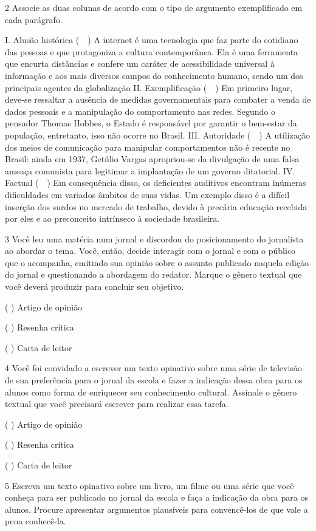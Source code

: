 \num{2} Associe as duas colunas de acordo com o tipo de argumento
exemplificado em cada parágrafo.

I. Alusão histórica (~~) A internet é uma tecnologia que faz
parte do cotidiano das pessoas e que protagoniza a cultura
contemporânea. Ela é uma ferramenta que encurta distâncias e confere um
caráter de acessibilidade universal à informação e aos mais diversos
campos do conhecimento humano, sendo um dos principais agentes da
globalização II. Exemplificação (~~) Em primeiro lugar,
deve-se ressaltar a ausência de medidas governamentais para combater a
venda de dados pessoais e a manipulação do comportamento nas redes.
Segundo o pensador Thomas Hobbes, o Estado é responsável por garantir o
bem-estar da população, entretanto, isso não ocorre no Brasil. III.
Autoridade (~~) A utilização dos meios de comunicação para
manipular comportamentos não é recente no Brasil: ainda em 1937, Getúlio
Vargas apropriou-se da divulgação de uma falsa ameaça comunista para
legitimar a implantação de um governo ditatorial. IV. Factual
(~~) Em consequência disso, os deficientes auditivos
encontram inúmeras dificuldades em variados âmbitos de suas vidas. Um
exemplo disso é a difícil inserção dos surdos no mercado de trabalho,
devido à precária educação recebida por eles e ao preconceito intrínseco
à sociedade brasileira.

\num{3} Você leu uma matéria num jornal e discordou do posicionamento do
jornalista ao abordar o tema. Você, então, decide interagir com o jornal
e com o público que o acompanha, emitindo sua opinião sobre o assunto
publicado naquela edição do jornal e questionando a abordagem do
redator. Marque o gênero textual que você deverá produzir para concluir
seu objetivo.

( ) Artigo de opinião

( ) Resenha crítica

(  ) Carta de leitor

\num{4} Você foi convidado a escrever um texto opinativo sobre uma série
de televisão de sua preferência para o jornal da escola e fazer a
indicação dessa obra para os alunos como forma de enriquecer seu
conhecimento cultural. Assinale o gênero textual que você precisará
escrever para realizar essa tarefa.

( ) Artigo de opinião

(  ) Resenha crítica

( ) Carta de leitor

\num{5} Escreva um texto opinativo sobre um livro, um filme ou uma série
que você conheça para ser publicado no jornal da escola e faça a
indicação da obra para os alunos. Procure apresentar argumentos
plausíveis para convencê-los de que vale a pena conhecê-la.

